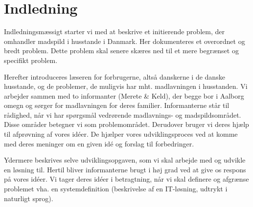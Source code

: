 \chapter{Indledning}
\label{chap:indledning}

Indledningsmæssigt starter vi med at beskrive et initierende problem, der omhandler madspild i husstande i Danmark. Her dokumenteres et overordnet og bredt problem. Dette problem skal senere skæres ned til et mere begrænset og specifikt problem.

Herefter introduceres læseren for forbrugerne, altså danskerne i de danske husstande, og de problemer, de muligvis har mht. madlavningen i husstanden. Vi arbejder sammen med to informanter (Merete \& Keld), der begge bor i Aalborg omegn og sørger for madlavningen for deres familier. Informanterne står til rådighed, når vi har spørgsmål vedrørende \fx madlavnings- og madspildsområdet. Disse områder betegner vi som problemområdet. Derudover bruger vi deres hjælp til afprøvning af vores idéer. De hjælper vores udviklingsproces ved at komme med deres meninger om en given idé og forslag til forbedringer.

Ydermere beskrives selve udviklingsopgaven, som vi skal arbejde med og udvikle en løsning til. Hertil bliver informanterne brugt i høj grad ved at give os respons på vores idéer. Vi tager deres idéer i betragtning, når vi skal definere og afgrænse problemet vha. en systemdefinition (beskrivelse af en IT-løsning, udtrykt i naturligt sprog).






